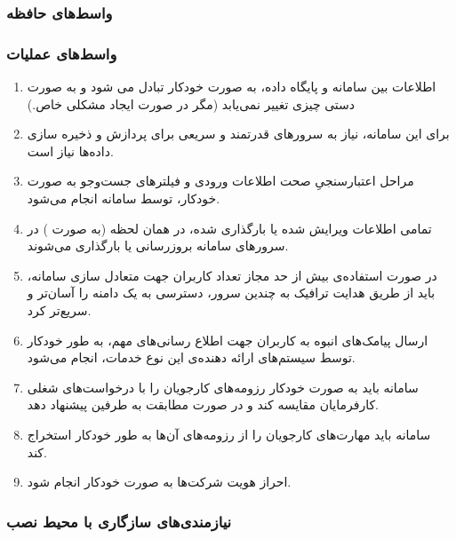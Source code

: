 \documentclass{report}
\begin{document}
				\subsubsection{واسط‌های حافظه}
				\subsubsection{واسط‌های عملیات}
					\begin{enumerate}
						\item 
						اطلاعات بین سامانه و پایگاه داده، به صورت خودکار تبادل می شود و به صورت دستی چیزی تغییر نمی‌یابد (مگر در صورت ایجاد مشکلی خاص.)
						\item 
						برای این سامانه، نیاز به سرورهای قدرتمند و سریعی برای پردازش و ذخیره سازی داده‌ها نیاز است.
						\item 
						مراحل اعتبارسنجیِ صحت اطلاعات ورودی و فیلترهای جست‌و‌جو به صورت خودکار، توسط سامانه انجام می‌شود.
						\item 
						تمامی اطلاعات ویرایش شده یا بارگذاری شده، در همان لحظه 
						(به صورت  )
						 در سرور‌های سامانه بروزرسانی یا بارگذاری می‌شوند.
						\item 
						در صورت استفاده‌ی بیش از حد مجاز تعداد کاربران جهت متعادل سازی سامانه، باید از طریق هدایت ترافیک به چندین سرور، دسترسی به یک دامنه را آسان‌تر و سریع‌تر کرد.
						\item 
						ارسال پیامک‌های انبوه به کاربران جهت اطلاع رسانی‌های مهم، به طور خودکار توسط سیستم‌های ارائه دهنده‌ی این نوع خدمات، انجام می‌شود.
						\item 
						سامانه باید به صورت خودکار رزومه‌های کارجویان را با درخواست‌های شغلی کارفرمایان مقایسه کند و در صورت مطابقت به طرفین پیشنهاد دهد.
						\item 
						سامانه باید مهارت‌های کارجویان را از رزومه‌های آن‌ها به طور خودکار استخراج کند.
						\item 
						احراز هویت شرکت‌ها به صورت خودکار انجام شود.
					\end{enumerate}
				\subsubsection{نیازمندی‌های سازگاری با محیط نصب}
\end{document}
